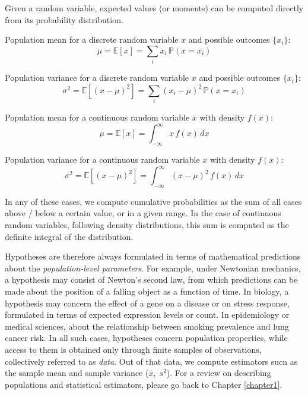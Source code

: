 \medskip

Given a random variable, expected values (or moments) can be computed directly from its probability distribution.

\medskip

Population mean for a discrete random variable \(x\) and possible outcomes \(\{x_i\}\):
\begin{equation}
    \mu = \mathbb{E}[x] = \sum_{i} x_i \, \mathbb{P}(x = x_i)
    \label{population_mean_discrete}
\end{equation}

Population variance for a discrete random variable \(x\) and possible outcomes \(\{x_i\}\):
\begin{equation}
    \sigma^2 = \mathbb{E}\!\left[(x - \mu)^2\right] = \sum_{i} (x_i - \mu)^2 \, \mathbb{P}(x = x_i)
    \label{population_var_discrete}
\end{equation}

Population mean for a continuous random variable \(x\) with density \(f(x)\):
\begin{equation}
    \mu = \mathbb{E}[x] = \int_{-\infty}^{\infty} x \, f(x)\, dx
    \label{population_mean_continuous}
\end{equation}

Population variance for a continuous random variable \(x\) with density \(f(x)\):
\begin{equation}
    \sigma^2 = \mathbb{E}\!\left[(x - \mu)^2\right] = \int_{-\infty}^{\infty} (x - \mu)^2 \, f(x)\, dx
    \label{population_var_continuous}
\end{equation}

In any of these cases, we compute cumulative probabilities as the sum of all cases above / below a certain value, or in a given range. In the case of continuous random variables, following density distributions, this sum is computed as the definite integral of the distribution.

\medskip

Hypotheses are therefore always formulated in terms of mathematical predictions about the \textit{population-level parameters}. For example, under Newtonian mechanics, a hypothesis may consist of Newton’s second law, from which predictions can be made about the position of a falling object as a function of time. In biology, a hypothesis may concern the effect of a gene on a disease or on stress response, formulated in terms of expected expression levels or count. In epidemiology or medical sciences, about the relationship between smoking prevalence and lung cancer risk. In all such cases, hypotheses concern population properties, while access to them is obtained only through finite samples of observations, collectively referred to as \textit{data}. Out of that data, we compute estimators sucn as the sample mean and sample variance (\(\bar{x}, \; s^2\)). For a review on describing populations and statistical estimators, please go back to Chapter \ref{chapter1}.

